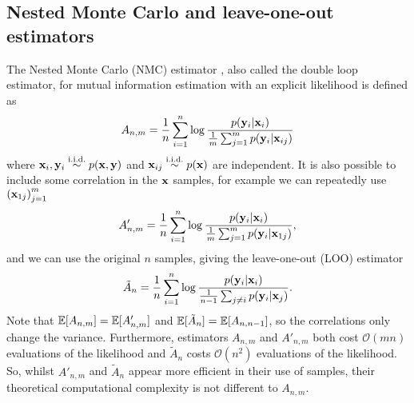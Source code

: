 \documentclass[a4paper, 10pt]{report}
\theoremstyle{plain}
\begin{document}
	\subsection{Nested Monte Carlo and leave-one-out estimators}
	\label{sec:nmc}
	The Nested Monte Carlo (NMC) estimator \citep{ryan2003estimating}, also called the double loop estimator, for mutual information estimation with an explicit likelihood is defined as 
	\begin{equation}
	A_{n,m} = \frac{1}{n}\sum_{i=1}^n \log \frac{p({\mathbf{y}}_i|{\mathbf{x}}_i)}{\frac{1}{m}\sum_{j=1}^m p({\mathbf{y}}_i|{\mathbf{x}}_{ij})}
	\end{equation}
	where ${\mathbf{x}}_i,{\mathbf{y}}_i \overset{\scriptstyle{\text{i.i.d.}}}{\sim} p({\mathbf{x}},{\mathbf{y}})$ and ${\mathbf{x}}_{ij} \overset{\scriptstyle{\text{i.i.d.}}}{\sim} p({\mathbf{x}})$ are independent.
	It is also possible to include some correlation in the ${\mathbf{x}}$ samples, for example we can repeatedly use $\left({\mathbf{x}}_{1j}\right)_{j=1}^m$
	\begin{equation}
	A'_{n,m} = \frac{1}{n}\sum_{i=1}^n \log \frac{p({\mathbf{y}}_i|{\mathbf{x}}_i)}{\frac{1}{m}\sum_{j=1}^m p({\mathbf{y}}_i|{\mathbf{x}}_{1j})},
	\end{equation}
	and we can use the original $n$ samples, giving the leave-one-out (LOO) estimator \citep{poole2018variational}
	\begin{equation}
	\tilde{A}_{n} = \frac{1}{n}\sum_{i=1}^n \log \frac{p({\mathbf{y}}_i|{\mathbf{x}}_i)}{\frac{1}{n-1}\sum_{j\ne i} p({\mathbf{y}}_i|{\mathbf{x}}_{j})}.
	\end{equation}
	Note that $\mathbb{E}[A_{n,m}] = \mathbb{E}[A'_{n,m}]$ and $\mathbb{E}[\tilde{A}_n] = \mathbb{E}[A_{n,n-1}]$, so the correlations only change the variance. 
	Furthermore, estimators $A_{n,m}$ and $A'_{n,m}$ both cost $\mathcal{O}(mn)$ evaluations of the likelihood and $\tilde{A}_n$ costs $\mathcal{O}(n^2)$ evaluations of the likelihood. So, whilst $A'_{n,m}$ and $\tilde{A}_n$ appear more efficient in their use of samples, their theoretical computational complexity is not different to $A_{n,m}$.
	
\end{document}
